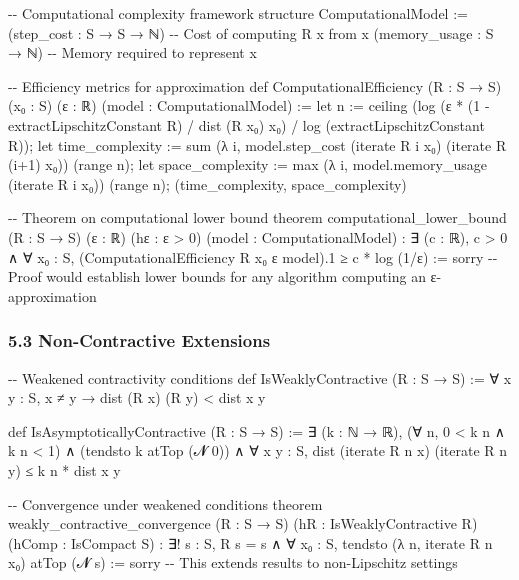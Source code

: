 \documentclass[
]{article}
\newenvironment{Shaded}{}{}
\newcommand{\NormalTok}[1]{#1}
\begin{document}
\begin{Shaded}
\begin{Highlighting}[]
\NormalTok{{-}{-} Computational complexity framework}
\NormalTok{structure ComputationalModel :=}
\NormalTok{  (step\_cost : S → S → ℕ)  {-}{-} Cost of computing R x from x}
\NormalTok{  (memory\_usage : S → ℕ)   {-}{-} Memory required to represent x}

\NormalTok{{-}{-} Efficiency metrics for approximation}
\NormalTok{def ComputationalEfficiency (R : S → S) (x₀ : S) (ε : ℝ) (model : ComputationalModel) :=}
\NormalTok{  let n := ceiling (log (ε * (1 {-} extractLipschitzConstant R) / dist (R x₀) x₀) / log (extractLipschitzConstant R));}
\NormalTok{  let time\_complexity := sum (λ i, model.step\_cost (iterate R i x₀) (iterate R (i+1) x₀)) (range n);}
\NormalTok{  let space\_complexity := max (λ i, model.memory\_usage (iterate R i x₀)) (range n);}
\NormalTok{  (time\_complexity, space\_complexity)}

\NormalTok{{-}{-} Theorem on computational lower bound}
\NormalTok{theorem computational\_lower\_bound (R : S → S) (ε : ℝ) (hε : ε \textgreater{} 0) (model : ComputationalModel) :}
\NormalTok{  ∃ (c : ℝ), c \textgreater{} 0 ∧ ∀ x₀ : S, (ComputationalEfficiency R x₀ ε model).1 ≥ c * log (1/ε) :=}
\NormalTok{  sorry {-}{-} Proof would establish lower bounds for any algorithm computing an ε{-}approximation}
\end{Highlighting}
\end{Shaded}

\subsubsection{5.3 Non-Contractive
Extensions}\label{non-contractive-extensions}

\begin{Shaded}
\begin{Highlighting}[]
\NormalTok{{-}{-} Weakened contractivity conditions}
\NormalTok{def IsWeaklyContractive (R : S → S) :=}
\NormalTok{  ∀ x y : S, x ≠ y → dist (R x) (R y) \textless{} dist x y}

\NormalTok{def IsAsymptoticallyContractive (R : S → S) :=}
\NormalTok{  ∃ (k : ℕ → ℝ), (∀ n, 0 \textless{} k n ∧ k n \textless{} 1) ∧ (tendsto k atTop (𝓝 0)) ∧}
\NormalTok{                  ∀ x y : S, dist (iterate R n x) (iterate R n y) ≤ k n * dist x y}

\NormalTok{{-}{-} Convergence under weakened conditions}
\NormalTok{theorem weakly\_contractive\_convergence}
\NormalTok{  (R : S → S) (hR : IsWeaklyContractive R) (hComp : IsCompact S) :}
\NormalTok{  ∃! s : S, R s = s ∧ ∀ x₀ : S, tendsto (λ n, iterate R n x₀) atTop (𝓝 s) :=}
\NormalTok{  sorry {-}{-} This extends results to non{-}Lipschitz settings}
\end{Highlighting}
\end{Shaded}
\end{document}
